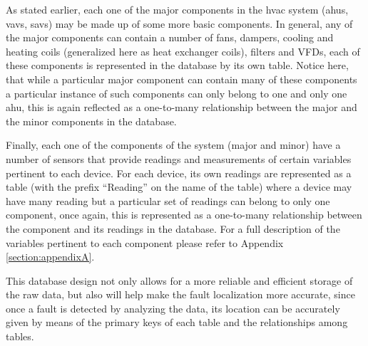 As stated earlier, each one of the major components in the \gls{hvac} system (\glspl{ahu}, \glspl{vav}, \glspl{sav}) may be made up of some more basic components. In general, any of the major components can contain a number of fans, dampers, cooling and heating coils (generalized here as heat exchanger coils), filters and VFDs, each of these components is represented in the database by its own table. Notice here, that while a particular major component can contain many of these components a particular instance of such components can only belong to one and only one \gls{ahu}, this is again reflected as a one-to-many relationship between the major and the minor components in the database.

Finally, each one of the components of the system (major and minor) have a number of sensors that provide readings and measurements of certain variables pertinent to each device. For each device, its own readings are represented as a table (with the prefix ``Reading'' on the name of the table) where a device may have many reading but a particular set of readings can belong to only one component, once again, this is represented as a one-to-many relationship between the component and its readings in the database. For a  full description of the variables pertinent to each component please refer to Appendix \ref{section:appendixA}.

This database design not only allows for a more reliable and efficient storage of the raw data, but also will help make the fault localization more accurate, since once a fault is detected by analyzing the data, its location can be accurately given by means of the primary keys of each table and the relationships among tables.
